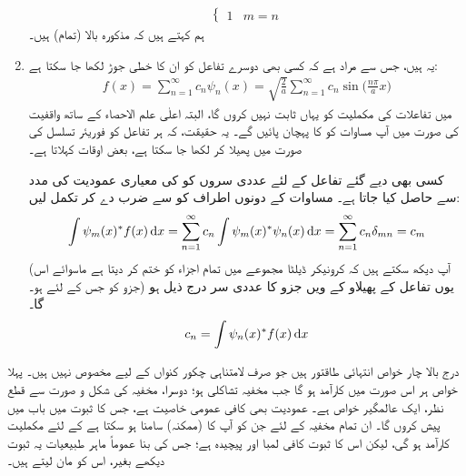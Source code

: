 \begin{enumerate}
\begin{align}
\begin{cases}
1 &  m=n
\end{cases}
\end{align} 
ہم کہتے ہیں کہ مذکورہ بالا (تمام)    ہیں۔ 
\item
 یہ  ہیں، جس سے مراد ہے کہ کسی  بھی دوسرے تفاعل  کو ان کا خطی جوڑ لکھا جا سکتا ہے:
\begin{align}\label{مساوات_شروڈنگر_کوئی_تفاعل}
f(x)=\sum_{n=1}^{\infty}c_{n}\psi_{n}(x)=\sqrt{\frac{2}{a}}\sum_{n=1}^{\infty}c_{n}\sin\big(\frac{n\pi}{a}x\big)
\end{align}
 میں تفاعلات    کی مکملیت کو یہاں ثابت نہیں کروں گا، البتہ  اعلٰی علم الاحصاء کے ساتھ واقفیت کی صورت میں آپ مساوات  کو  کا  پہچان پائیں گے۔ یہ حقیقت، کہ ہر تفاعل کو فوریئر تسلسل کی صورت میں پھیلا کر لکھا جا سکتا ہے، بعض اوقات  کہلاتا ہے۔

کسی بھی دیے گئے تفاعل  کے لئے عددی سروں   کو   کی معیاری عمودیت کی مدد سے حاصل کیا جاتا ہے۔ مساوات  کے دونوں اطراف کو  سے ضرب دے کر تکمل لیں:
 \begin{align}
\int \psi_{m}(x)^*f(x)\dif{x}=\sum_{n=1}^{\infty}c_{n}\int\psi_{m}(x)^*\psi_{n}(x)\dif{x}=\sum_{n=1}^{\infty}c_{n}\delta_{mn}=c_{m}
\end{align}
(آپ دیکھ سکتے ہیں کہ کرونیکر ڈیلٹا مجموعے میں تمام اجزاء کو ختم کر دیتا ہے ماسوائے اس جزو کو جس کے لئے   ہو۔) یوں تفاعل    کے پھیلاو  کے  ویں جزو کا عددی سر درج ذیل ہو گا۔
\begin{align}\label{مساوات_شروڈنگر_عددی_سر}
c_{n}=\int\psi_{n}(x)^*f(x)\dif{x}
\end{align}
\end{enumerate}

درج بالا   چار خواص انتہائی طاقتور ہیں جو صرف لامتناہی چکور  کنواں کے لیے مخصوص نہیں ہیں۔ پہلا خواص ہر اس صورت میں کارآمد ہو گا جب مخفیہ  تشاکلی ہو؛  دوسرا، مخفیہ  کی شکل و صورت سے قطع نظر، ایک عالمگیر خواص ہے۔ عمودیت بھی کافی  عمومی خاصیت ہے، جس کا ثبوت میں باب   میں پیش کروں گا۔  ان تمام مخفیہ کے لئے جن کو آپ کا (ممکنہ) سامنا ہو سکتا ہے کے لئے مکملیت  کارآمد ہو گی، لیکن اس کا ثبوت کافی لمبا اور  پیچیدہ ہے؛ جس کی بنا عموماً ماہر طبیعیات یہ ثبوت دیکھے بغیر، اس کو مان لیتے ہیں۔

